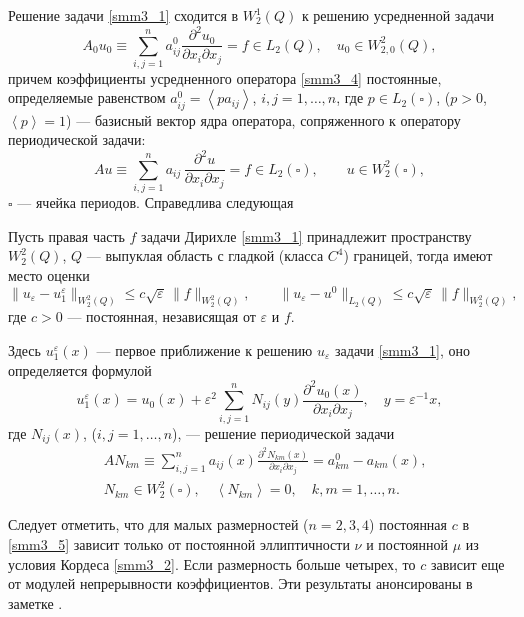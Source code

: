 Решение задачи \eqref{smm3_1} сходится в $W_2^1(Q)$ к решению усредненной задачи
\begin{equation}\label{smm3_4}
A_0u_0\equiv \sum_{i,j=1}^na_{ij}^0\frac{\partial^2u_0}{\partial x_i
\partial x_j}=f\in L_2(Q),\quad u_0\in W_{2,0}^2(Q),
\end{equation}
 причем коэффициенты усредненного оператора \eqref{smm3_4} постоянные, определяемые  равенством $a_{ij}^0=\left<pa_{ij}\right>$,
$i,j=1,\dots,n$, где $p\in L_2(\square)$, ($p>0$, $\left\langle p\right\rangle=1$) --- базисный вектор ядра оператора, сопряженного к оператору периодической задачи:
$$
A u\equiv\sum\limits_{i,j=1}^na_{ij}\,
\frac{\partial^2u}{\partial x_i\partial x_j}=f\in
L_2(\square), \qquad
   u\in W_{2}^2(\square),
$$
$\square$ --- ячейка периодов.
Справедлива следующая

\begin{theorem}
Пусть правая часть $f$ задачи Дирихле \eqref{smm3_1} принадлежит пространству $W^2_2(Q)$,  $Q$ --- выпуклая область с гладкой \textrm{(}класса $C^4$\textrm{)} границей, тогда имеют место оценки
\begin{equation}\label{smm3_5}
\|u_\varepsilon-u_1^\varepsilon\|_{W^2_2(Q)}\leqslant c\sqrt{\varepsilon}\,\|f\|_{W^2_2(Q)},\qquad
\|u_\varepsilon-u^0\|_{L_2(Q)}\leqslant c\sqrt{\varepsilon}\,\|f\|_{W^2_2(Q)},
\end{equation}
где $c>0$ --- постоянная, независящая от $\varepsilon$ и $f$.
\end{theorem}

Здесь $u_1^\varepsilon(x)$ --- первое приближение  к решению $u_\varepsilon$  задачи  \eqref{smm3_1}, оно определяется формулой
$$
u_1^\varepsilon(x)=u_0(x)+\varepsilon^2\sum_{i,j=1}^nN_{ij}(y)\frac{\partial^2u_0(x)}
{\partial x_i\partial x_j},\quad y=\varepsilon^{-1}x,
$$
где $N_{ij}(x)$, ($i,j=1,\dots,n$), --- решение периодической задачи
\begin{align*}
&AN_{km}\equiv\sum_{i,j=1}^na_{ij}(x)\frac{\partial^2N_{km}(x)}{\partial x_i\partial x_j}=
a_{km}^0-a_{km}(x),\\
&N_{km}\in W^2_2(\square),\quad \left<N_{km}\right>=0,\quad k,m=1,\dots,n.
\end{align*}

Следует отметить, что для малых размерностей ($n=2,3,4$) постоянная $c$ в
\eqref{smm3_5} зависит только от постоянной эллиптичности $\nu$ и постоянной $\mu$
из условия Кордеса \eqref{smm3_2}. Если размерность больше четырех, то $c$ зависит
еще от модулей непрерывности коэффициентов.
Эти результаты анонсированы в заметке \cite{smm_SM}. 